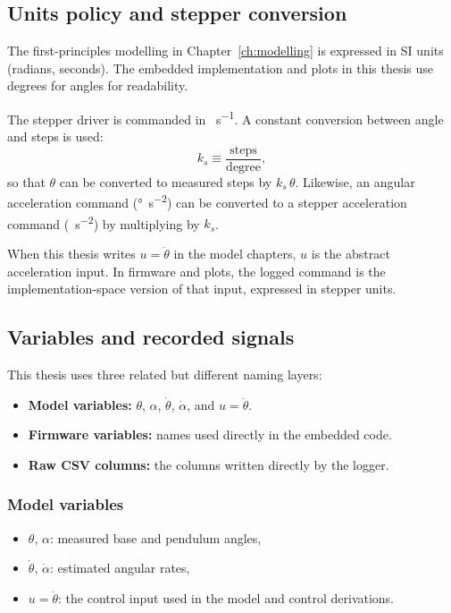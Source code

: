 \subsection{Units policy and stepper conversion}
The first-principles modelling in Chapter~\ref{ch:modelling} is expressed in SI units (radians, seconds). The embedded implementation and plots in this thesis use degrees for angles for readability.

The stepper driver is commanded in \si{\step\per\second}. A constant conversion between angle and steps is used:
\[
k_s \equiv \frac{\text{steps}}{\text{degree}},
\]
so that $\theta$ can be converted to measured steps by $k_s\,\theta$. Likewise, an angular acceleration command (\si{\degree\per\second\squared}) can be converted to a stepper acceleration command (\si{\step\per\second\squared}) by multiplying by $k_s$.

When this thesis writes $u=\ddot{\theta}$ in the model chapters, $u$ is the abstract acceleration input. In firmware and plots, the logged command is the implementation-space version of that input, expressed in stepper units.

\subsection{Variables and recorded signals}
This thesis uses three related but different naming layers:
\begin{itemize}
  \item \textbf{Model variables:} $\theta$, $\alpha$, $\dot{\theta}$, $\dot{\alpha}$, and $u=\ddot{\theta}$.
  \item \textbf{Firmware variables:} names used directly in the embedded code.
  \item \textbf{Raw CSV columns:} the columns written directly by the logger.
\end{itemize}

\subsubsection*{Model variables}
\begin{itemize}
  \item $\theta$, $\alpha$: measured base and pendulum angles,
  \item $\dot{\theta}$, $\dot{\alpha}$: estimated angular rates,
  \item $u=\ddot{\theta}$: the control input used in the model and control derivations.
\end{itemize}

